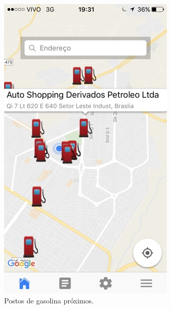\begin{anexosenv}
\begin{figure}[H]
    \centering
    \includegraphics[scale=0.5]{figuras/app_2.jpg}
    \caption[Postos de gasolina próximos]{Postos de gasolina próximos.}
    \label{img:postos_de_gasolina_próximos}
\end{figure}


\end{anexosenv}
